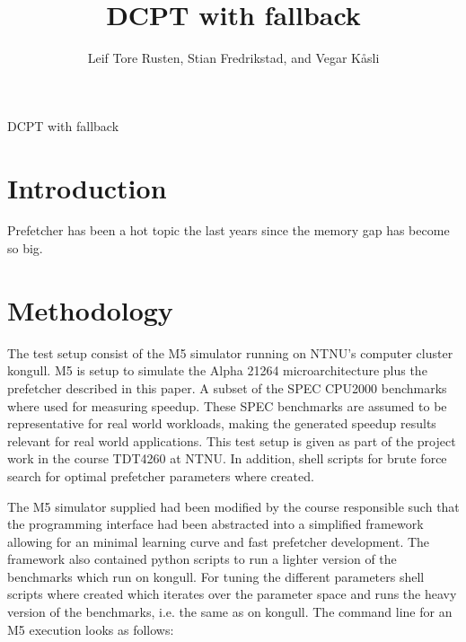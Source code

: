 \documentclass[12pt,journal,compsoc]{IEEEtran}
\begin{document}
\title{DCPT with fallback}
\author{Leif Tore Rusten,
        Stian Fredrikstad,
        and Vegar K\aa sli}

%
{DCPT with fallback}


\maketitle
\IEEEdisplaynotcompsoctitleabstractindextext
\IEEEpeerreviewmaketitle

\section{Introduction}
Prefetcher has been a hot topic the last years since the memory gap has become so big.

\section{Methodology}
The test setup consist of the M5 simulator running on NTNU's computer
cluster kongull. M5 is setup to simulate the Alpha 21264 microarchitecture
plus the prefetcher described in this paper. A subset of the SPEC CPU2000
benchmarks where used for measuring speedup. These SPEC benchmarks are assumed
to be representative for real world workloads, making the generated speedup
results relevant for real world applications. This test setup is given
as part of the project work in the course TDT4260 at NTNU. In addition,
shell scripts for brute force search for optimal prefetcher parameters
where created.

The M5 simulator supplied had been modified by the course responsible such
that the programming interface had been abstracted into a simplified framework
allowing for an minimal learning curve and fast prefetcher development. The
framework also contained python scripts to run a lighter version of the
benchmarks which run on kongull. For tuning the different parameters shell
scripts where created which iterates over the parameter space and runs the
heavy version of the benchmarks, i.e. the same as on kongull. The command line
for an M5 execution looks as follows:
\end{document}
